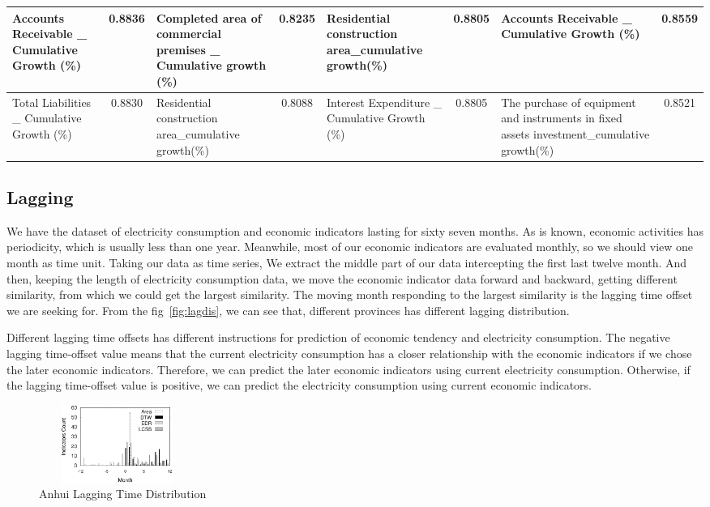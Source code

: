 \begin{table}
\begin{tabular}{|p{3cm}|c|p{3cm}|c|p{3cm}|c|p{3cm}|c|}
	Accounts Receivable \_ Cumulative Growth (\%)& 0.8836& Completed area of commercial premises \_ Cumulative growth (\%) & 0.8235&Residential construction area\_cumulative growth(\%) & 0.8805 &Accounts Receivable \_ Cumulative Growth (\%)& 0.8559\\ \hline
	Total Liabilities \_ Cumulative Growth (\%)& 0.8830 & Residential construction area\_cumulative growth(\%)&0.8088 & Interest Expenditure \_ Cumulative Growth (\%)&0.8805 & The purchase of equipment and instruments in fixed assets investment\_cumulative growth(\%) & 0.8521\\ \hline
\end{tabular}
\end{table}

\subsection{Lagging}
We have the dataset of electricity consumption and economic indicators lasting for sixty seven months. As is known, economic activities has 
periodicity, which is usually less than one year. Meanwhile, most of our economic indicators are evaluated monthly, so we should view one month as time unit. Taking our data as time series, We extract the middle part of our data intercepting the first last twelve month. And then, keeping the length of electricity consumption data, we move the economic indicator data forward and backward, getting different similarity, from which we could get the largest similarity. The moving month responding to the largest similarity is the lagging time offset we are seeking for. From the fig~\ref{fig:lagdis}, we can see that, different provinces has different lagging distribution.
 
Different lagging time offsets has different instructions for prediction of economic tendency and electricity consumption. The negative lagging time-offset value means that the current electricity consumption has a closer relationship with the economic indicators if we chose the later economic indicators. Therefore, we can predict the later economic indicators using current electricity consumption. Otherwise, if the lagging time-offset value is positive, we can predict the electricity consumption using current economic indicators.   
\begin{figure}
	\centering
	\includegraphics[height=1in, width=2in]{fig/anhui_lag_dis}
	\caption{Anhui Lagging Time Distribution}
	\label{fig:anhui_lag}
\end{figure}

